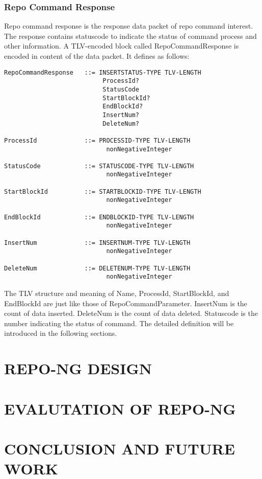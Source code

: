 \documentclass{acm_proc_article-sp}
\begin{document}
\subsubsection{Repo Command Response}
Repo command response is the response data packet of repo command interest. The response contains statuscode to indicate the status of command process and other information. A TLV-encoded block called RepoCommandResponse is encoded in content of the data packet. It defines as follows:

\begin{figure*}
\begin{framed}
\begin{BVerbatim}
RepoCommandResponse   ::= INSERTSTATUS-TYPE TLV-LENGTH
                           ProcessId?
                           StatusCode
                           StartBlockId?
                           EndBlockId?
                           InsertNum?
                           DeleteNum?

ProcessId             ::= PROCESSID-TYPE TLV-LENGTH
                            nonNegativeInteger 

StatusCode            ::= STATUSCODE-TYPE TLV-LENGTH
                            nonNegativeInteger    

StartBlockId          ::= STARTBLOCKID-TYPE TLV-LENGTH
                            nonNegativeInteger

EndBlockId            ::= ENDBLOCKID-TYPE TLV-LENGTH
                            nonNegativeInteger

InsertNum             ::= INSERTNUM-TYPE TLV-LENGTH
                            nonNegativeInteger

DeleteNum             ::= DELETENUM-TYPE TLV-LENGTH
                            nonNegativeInteger

\end{BVerbatim}
\end{framed}
\end{figure*}

The TLV structure and meaning of Name, ProcessId, StartBlockId, and EndBlockId are just like those of RepoCommandParameter. InsertNum is the count of data inserted. DeleteNum is the count of data deleted. Statuscode is the number indicating the status of command. The detailed definition will be introduced in the following sections.



\section{REPO-NG DESIGN}

\section{EVALUTATION OF REPO-NG}

\section{CONCLUSION AND FUTURE WORK}



\end{document}
